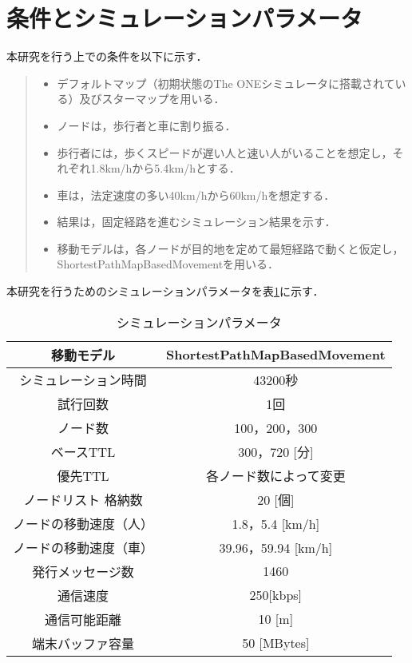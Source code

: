 \documentclass[11pt]{icsthesis}
\begin{document}
\section{条件とシミュレーションパラメータ}
本研究を行う上での条件を以下に示す．
\begin{quote}
 \begin{itemize}
  \item デフォルトマップ（初期状態のThe ONEシミュレータに搭載されている）及びスターマップを用いる．
  \item ノードは，歩行者と車に割り振る．
  \item 歩行者には，歩くスピードが遅い人と速い人がいることを想定し，それぞれ1.8km/hから5.4km/hとする．
  \item 車は，法定速度の多い40km/hから60km/hを想定する．
  \item 結果は，固定経路を進むシミュレーション結果を示す．
  \item 移動モデルは，各ノードが目的地を定めて最短経路で動くと仮定し，ShortestPathMapBasedMovementを用いる．
 \end{itemize}
\end{quote}
本研究を行うためのシミュレーションパラメータを表\ref{simpara}に示す．

\begin{table}[h]
    \begin{center}
      \caption[]{シミュレーションパラメータ}
      \label{simpara}
      \begin{tabular}{|c|c|}
        \hline
        移動モデル & ShortestPathMapBasedMovement\\
        \hline
        シミュレーション時間 & 43200秒\\
        \hline
        試行回数 & 1回\\
        \hline
        ノード数 & 100，200，300\\
        \hline
        ベースTTL & 300，720 [分]\\
        \hline
        優先TTL & 各ノード数によって変更\\
        \hline
        ノードリスト
        格納数 & 20 [個]\\
        \hline
        ノードの移動速度（人） & 1.8，5.4 [km/h]\\
        \hline
        ノードの移動速度（車） & 39.96，59.94 [km/h]\\
        \hline
        発行メッセージ数 & 1460\\
        \hline
        通信速度 & 250[kbps]\\
        \hline
        通信可能距離 & 10 [m]\\
        \hline
        端末バッファ容量 & 50 [MBytes]\\
        \hline
      \end{tabular}
    \end{center}
\end{table}
\end{document}
